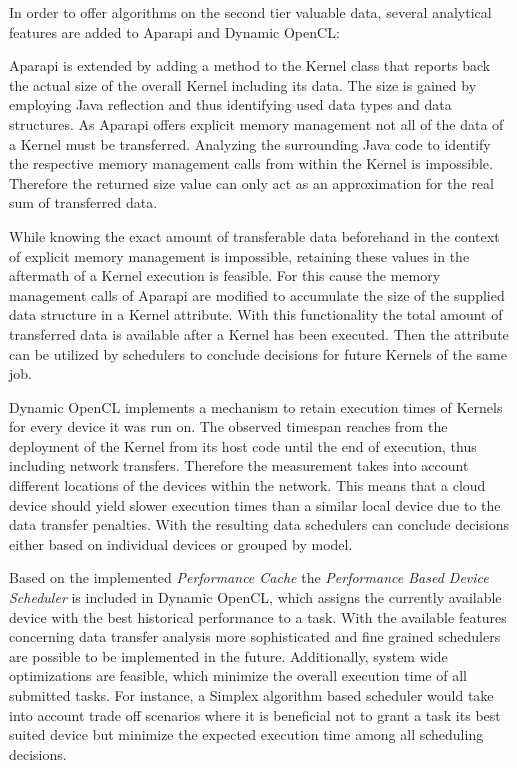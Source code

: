 In order to offer algorithms on the second tier valuable data, several analytical features are added to Aparapi and Dynamic OpenCL:
\begin{description}[style=nextline]
	\item[Kernel Data Size] 
	Aparapi is extended by adding a method to the Kernel class that reports back the actual size of the overall Kernel including its data. The size is gained by employing Java reflection and thus identifying used data types and data structures. As Aparapi offers explicit memory management not all of the data of a Kernel must be transferred. Analyzing the surrounding Java code to identify the respective memory management calls from within the Kernel is impossible. Therefore the returned size value can only act as an approximation for the real sum of transferred data.
	\item[Historical Data Transfer] 
	While knowing the exact amount of transferable data beforehand in the context of explicit memory management is impossible, retaining these values in the aftermath of a Kernel execution is feasible. For this cause the memory management calls of Aparapi are modified to accumulate the size of the supplied data structure in a Kernel attribute. With this functionality the total amount of transferred data is available after a Kernel has been executed. Then the attribute can be utilized by schedulers to conclude decisions for future Kernels of the same job.
	\item[Performance Cache]
	Dynamic OpenCL implements a mechanism to retain execution times of Kernels for every device it was run on. The observed timespan reaches from the deployment of the Kernel from its host code until the end of execution, thus including network transfers. Therefore the measurement takes into account different locations of the devices within the network. This means that a cloud device should yield slower execution times than a similar local device due to the data transfer penalties. With the resulting data schedulers can conclude decisions either based on individual devices or grouped by model.
\end{description}

Based on the implemented \textit{Performance Cache} the \textit{Performance Based Device Scheduler} is included in Dynamic OpenCL, which assigns the currently available device with the best historical performance to a task. With the available features concerning data transfer analysis more sophisticated and fine grained schedulers are possible to be implemented in the future. Additionally, system wide optimizations are feasible, which minimize the overall execution time of all submitted tasks. For instance, a Simplex algorithm based scheduler would take into account trade off scenarios where it is beneficial not to grant a task its best suited device but minimize the expected execution time among all scheduling decisions. 

